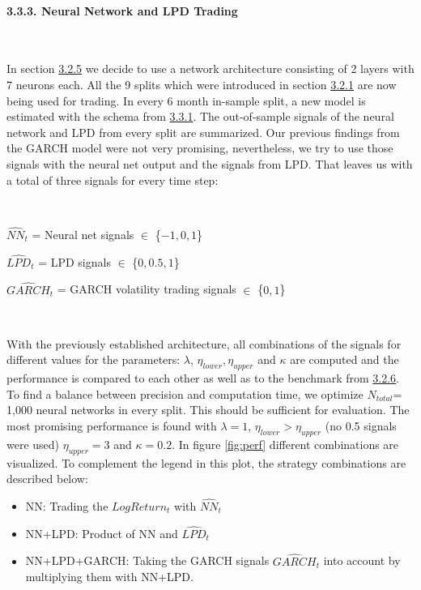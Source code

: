 \documentclass[
]{article}
\begin{document}
\newpage

\hypertarget{neural-network-and-lpd-trading}{%
\paragraph{3.3.3. Neural Network and LPD
Trading}\label{neural-network-and-lpd-trading}}

~

In section \protect\hyperlink{mod-select}{3.2.5} we decide to use a
network architecture consisting of 2 layers with 7 neurons each. All the
9 splits which were introduced in section
\protect\hyperlink{test_train}{3.2.1} are now being used for trading. In
every 6 month in-sample split, a new model is estimated with the schema
from \protect\hyperlink{trading_lpd_nn}{3.3.1}. The out-of-sample
signals of the neural network and LPD from every split are summarized.
Our previous findings from the GARCH model were not very promising,
nevertheless, we try to use those signals with the neural net output and
the signals from LPD. That leaves us with a total of three signals for
every time step:

~

\(\hat{NN}_{t}\) = Neural net signals \(\in\) \{\(-1,0,1\)\}

\(\hat{LPD}_{t}\) = LPD signals \(\in\) \{\(0,0.5,1\)\}

\(\hat{GARCH}_{t}\) = GARCH volatility trading signals \(\in\)
\{\(0,1\)\}

~

With the previously established architecture, all combinations of the
signals for different values for the parameters: \(\lambda\),
\(\eta_{lower},\eta_{upper}\) and \(\kappa\) are computed and the
performance is compared to each other as well as to the benchmark from
\protect\hyperlink{benchmark}{3.2.6}. To find a balance between
precision and computation time, we optimize \(N_{total}\)= 1,000 neural
networks in every split. This should be sufficient for evaluation. The
most promising performance is found with \(\lambda = 1\),
\(\eta_{lower} > \eta_{upper}\) (no 0.5 signals were used)
\(\eta_{upper}=3\) and \(\kappa = 0.2\). In figure \ref{fig:perf}
different combinations are visualized. To complement the legend in this
plot, the strategy combinations are described below:

\begin{itemize}
\item
  NN: Trading the \(LogReturn_{t}\) with \(\hat{NN}_{t}\)
\item
  NN+LPD: Product of NN and \(\hat{LPD}_{t}\)
\item
  NN+LPD+GARCH: Taking the GARCH signals \(\hat{GARCH}_{t}\) into
  account by multiplying them with NN+LPD.
\end{itemize}
\end{document}

